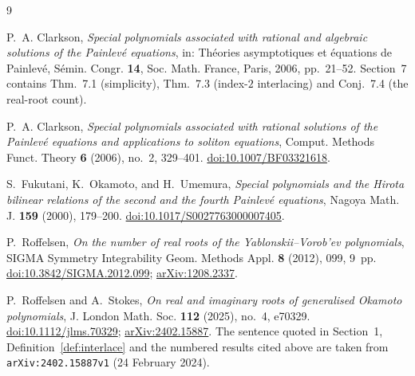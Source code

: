 \documentclass[11pt]{amsart}
\theoremstyle{definition}
\begin{document}
\begin{thebibliography}{9}

P.~A. Clarkson,
\emph{Special polynomials associated with rational and algebraic solutions of
the Painlev\'e equations},
in: Th\'eories asymptotiques et \'equations de Painlev\'e,
S\'emin. Congr. \textbf{14}, Soc. Math. France, Paris, 2006, pp.~21--52.
Section~7 contains Thm.~7.1 (simplicity), Thm.~7.3 (index-$2$ interlacing)
and Conj.~7.4 (the real-root count).

P.~A. Clarkson,
\emph{Special polynomials associated with rational solutions of the Painlev\'e
equations and applications to soliton equations},
Comput. Methods Funct. Theory \textbf{6} (2006), no.~2, 329--401.
\href{https://doi.org/10.1007/BF03321618}{doi:10.1007/BF03321618}.

S.~Fukutani, K.~Okamoto, and H.~Umemura,
\emph{Special polynomials and the Hirota bilinear relations of the second and
the fourth Painlev\'e equations},
Nagoya Math. J. \textbf{159} (2000), 179--200.
\href{https://doi.org/10.1017/S0027763000007405}{doi:10.1017/S0027763000007405}.

P.~Roffelsen,
\emph{On the number of real roots of the Yablonskii--Vorob'ev polynomials},
SIGMA Symmetry Integrability Geom. Methods Appl. \textbf{8} (2012), 099,
9~pp.
\href{https://doi.org/10.3842/SIGMA.2012.099}{doi:10.3842/SIGMA.2012.099};
\href{https://arxiv.org/abs/1208.2337}{arXiv:1208.2337}.

P.~Roffelsen and A.~Stokes,
\emph{On real and imaginary roots of generalised Okamoto polynomials},
J. London Math. Soc. \textbf{112} (2025), no.~4, e70329.
\href{https://doi.org/10.1112/jlms.70329}{doi:10.1112/jlms.70329};
\href{https://arxiv.org/abs/2402.15887}{arXiv:2402.15887}.
The sentence quoted in Section~1, Definition~\ref{def:interlace} and the
numbered results cited above are taken from \texttt{arXiv:2402.15887v1}
(24 February 2024).

\end{thebibliography}
\end{document}
